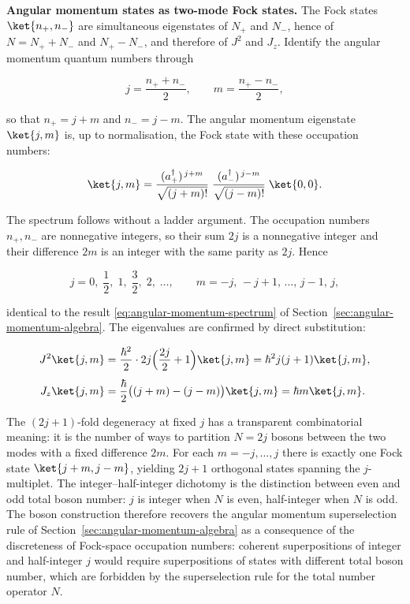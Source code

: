 \medskip\noindent\textbf{Angular momentum states as two-mode Fock states.}
The Fock states $\ket{n_+, n_-}$ are simultaneous eigenstates of $N_+$ and $N_-$, hence of $N = N_+ + N_-$ and $N_+ - N_-$, and therefore of $J^2$ and $J_z$. Identify the angular momentum quantum numbers through
\begin{linenomath}
  \begin{equation*}
    j = \frac{n_+ + n_-}{2},\qquad
    m = \frac{n_+ - n_-}{2},
  \end{equation*}
\end{linenomath}
so that $n_+ = j + m$ and $n_- = j - m$. The angular momentum eigenstate $\ket{j,m}$ is, up to normalisation, the Fock state with these occupation numbers:
\begin{linenomath}
  \begin{equation}
    \ket{j,m}
    = \frac{(a_+^\dagger)^{\,j+m}}{\sqrt{(j+m)!}}\;
      \frac{(a_-^\dagger)^{\,j-m}}{\sqrt{(j-m)!}}\;
      \ket{0,0}.
    \label{eq:schwinger-states}
  \end{equation}
\end{linenomath}
The spectrum follows without a ladder argument. The occupation numbers $n_+, n_-$ are nonnegative integers, so their sum $2j$ is a nonnegative integer and their difference $2m$ is an integer with the same parity as $2j$. Hence
\begin{linenomath}
  \begin{equation*}
    j = 0,\;\frac12,\;1,\;\frac32,\;2,\;\ldots,
    \qquad
    m = -j,\,-j+1,\,\ldots,\,j-1,\,j,
  \end{equation*}
\end{linenomath}
identical to the result \eqref{eq:angular-momentum-spectrum} of Section~\ref{sec:angular-momentum-algebra}. The eigenvalues are confirmed by direct substitution:
\begin{linenomath}
  \begin{align*}
    J^2\ket{j,m}
    &= \frac{\hbar^2}{2}\cdot 2j\Bigl(\frac{2j}{2}+1\Bigr)\ket{j,m}
       = \hbar^2 j(j+1)\ket{j,m}, \\[4pt]
    J_z\ket{j,m}
    &= \frac{\hbar}{2}\bigl((j+m) - (j-m)\bigr)\ket{j,m}
       = \hbar m\ket{j,m}.
  \end{align*}
\end{linenomath}
The $(2j+1)$-fold degeneracy at fixed $j$ has a transparent combinatorial meaning: it is the number of ways to partition $N = 2j$ bosons between the two modes with a fixed difference $2m$. For each $m = -j,\ldots,j$ there is exactly one Fock state $\ket{j+m, j-m}$, yielding $2j+1$ orthogonal states spanning the $j$-multiplet. The integer--half-integer dichotomy is the distinction between even and odd total boson number: $j$ is integer when $N$ is even, half-integer when $N$ is odd. The boson construction therefore recovers the angular momentum superselection rule of Section~\ref{sec:angular-momentum-algebra} as a consequence of the discreteness of Fock-space occupation numbers: coherent superpositions of integer and half-integer $j$ would require superpositions of states with different total boson number, which are forbidden by the superselection rule for the total number operator $N$.

